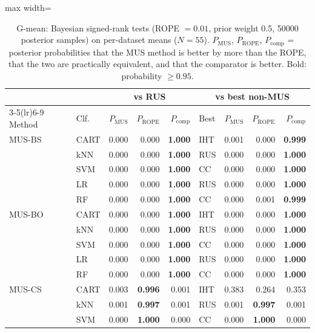 \begin{table}[!htbp]
\centering
\caption{G-mean: Bayesian signed-rank tests (ROPE $=0.01$, prior weight 0.5, 50000 posterior samples) on per-dataset means ($N=55$). $P_{\mathrm{MUS}}$, $P_{\mathrm{ROPE}}$, $P_{\mathrm{comp}}$ = posterior probabilities that the MUS method is better by more than the ROPE, that the two are practically equivalent, and that the comparator is better. Bold: probability $\geq 0.95$.}
\label{tab:bayes_gmean}
\scriptsize
\setlength{\tabcolsep}{3pt}
\begin{adjustbox}{max width=\linewidth}
\begin{tabular}{llrrrlrrr}
\toprule
 & & \multicolumn{3}{c}{vs RUS} & \multicolumn{4}{c}{vs best non-MUS} \\
\cmidrule(lr){3-5}\cmidrule(lr){6-9}
Method & Clf. & $P_{\mathrm{MUS}}$ & $P_{\mathrm{ROPE}}$ & $P_{\mathrm{comp}}$ & Best & $P_{\mathrm{MUS}}$ & $P_{\mathrm{ROPE}}$ & $P_{\mathrm{comp}}$ \\
\midrule
MUS-BS & CART & 0.000 & 0.000 & \textbf{1.000} & IHT & 0.001 & 0.000 & \textbf{0.999} \\
 & kNN & 0.000 & 0.000 & \textbf{1.000} & RUS & 0.000 & 0.000 & \textbf{1.000} \\
 & SVM & 0.000 & 0.000 & \textbf{1.000} & CC & 0.000 & 0.000 & \textbf{1.000} \\
 & LR & 0.000 & 0.000 & \textbf{1.000} & RUS & 0.000 & 0.000 & \textbf{1.000} \\
 & RF & 0.000 & 0.000 & \textbf{1.000} & CC & 0.000 & 0.001 & \textbf{0.999} \\
\midrule
MUS-BO & CART & 0.000 & 0.000 & \textbf{1.000} & IHT & 0.000 & 0.000 & \textbf{1.000} \\
 & kNN & 0.000 & 0.000 & \textbf{1.000} & RUS & 0.000 & 0.000 & \textbf{1.000} \\
 & SVM & 0.000 & 0.000 & \textbf{1.000} & CC & 0.000 & 0.000 & \textbf{1.000} \\
 & LR & 0.000 & 0.000 & \textbf{1.000} & RUS & 0.000 & 0.000 & \textbf{1.000} \\
 & RF & 0.000 & 0.000 & \textbf{1.000} & CC & 0.000 & 0.000 & \textbf{1.000} \\
\midrule
MUS-CS & CART & 0.003 & \textbf{0.996} & 0.001 & IHT & 0.383 & 0.264 & 0.353 \\
 & kNN & 0.001 & \textbf{0.997} & 0.001 & RUS & 0.001 & \textbf{0.997} & 0.001 \\
 & SVM & 0.000 & \textbf{1.000} & 0.000 & CC & 0.000 & \textbf{1.000} & 0.000 \\

\end{tabular}
\end{adjustbox}
\end{table}
